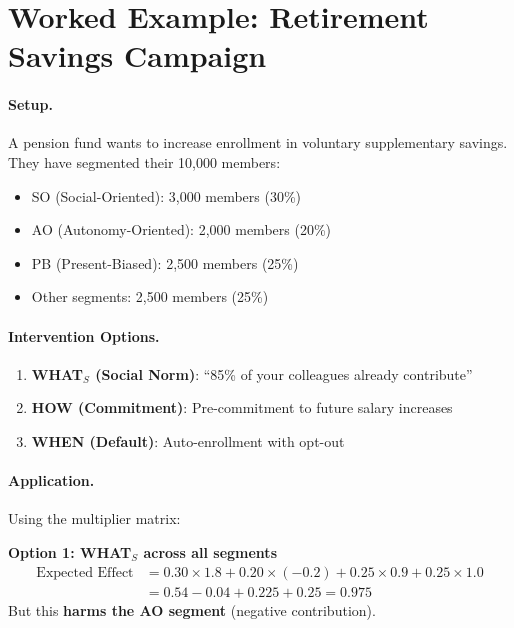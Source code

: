 
\section{Worked Example: Retirement Savings Campaign}
\label{sec:qq-example}

\paragraph{Setup.} A pension fund wants to increase enrollment in voluntary
supplementary savings. They have segmented their 10,000 members:

\begin{itemize}[nosep]
\item SO (Social-Oriented): 3,000 members (30\%)
\item AO (Autonomy-Oriented): 2,000 members (20\%)
\item PB (Present-Biased): 2,500 members (25\%)
\item Other segments: 2,500 members (25\%)
\end{itemize}

\paragraph{Intervention Options.}
\begin{enumerate}
\item \textbf{WHAT$_S$ (Social Norm)}: ``85\% of your colleagues already contribute''
\item \textbf{HOW (Commitment)}: Pre-commitment to future salary increases
\item \textbf{WHEN (Default)}: Auto-enrollment with opt-out
\end{enumerate}

\paragraph{Application.} Using the multiplier matrix:

\textbf{Option 1: WHAT$_S$ across all segments}
\begin{align}
\text{Expected Effect} &= 0.30 \times 1.8 + 0.20 \times (-0.2) + 0.25 \times 0.9 + 0.25 \times 1.0 \\
&= 0.54 - 0.04 + 0.225 + 0.25 = 0.975
\end{align}
But this \textbf{harms the AO segment} (negative contribution).

